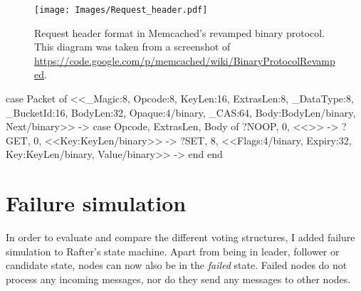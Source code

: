 \documentclass[11pt,chapterprefix=true,toc=bibliography,numbers=noendperiod,
               footnotes=multiple,twoside]{scrreprt}
\begin{document}
\begin{figure}[p]
    \centering
    \texttt{[image: Images/Request\_header.pdf]}
    \caption[Request header format in Memcached's revamped binary protocol]{Request header format in Memcached's revamped binary protocol. This diagram was taken from a screenshot of \url{https://code.google.com/p/memcached/wiki/BinaryProtocolRevamped}.}
    \label{fig:request-header}
\end{figure}

\begin{listing}[p]
    \begin{erlangcode}
case Packet of
    <<_Magic:8,    Opcode:8,    KeyLen:16,
      ExtrasLen:8, _DataType:8, _BucketId:16,
      BodyLen:32,
      Opaque:4/binary,     %
      _CAS:64,             %
      Body:BodyLen/binary, %
      Next/binary>> ->     %
        case {Opcode, ExtrasLen, Body} of
            {?NOOP, 0, <<>>} ->
            {?GET,  0, <<Key:KeyLen/binary>>} ->
            {?SET,  8, <<Flags:4/binary, Expiry:32, Key:KeyLen/binary,
                         Value/binary>>} ->
        end
end
    \end{erlangcode}
    \caption[Request decoding in Erlang]{This listing shows the relevant part of the function which decodes Memcached requests from the binary protocol described in \cref{fig:request-header}. The structure of the \texttt{case Packet of} statement reflects the structure of the packet header. Note how we can use the variable \texttt{BodyLen} captured in the case statement to specify the size of the \texttt{Body} variable within the same case statement. Variables preceded by an underscore are not used.}
    \label{lst:request-header}
\end{listing}

\section{Failure simulation}

In order to evaluate and compare the different voting structures, I added failure simulation to Rafter's state machine. Apart from being in leader, follower or candidate state, nodes can now also be in the \textit{failed} state. Failed nodes do not process any incoming messages, nor do they send any messages to other nodes.
\end{document}
